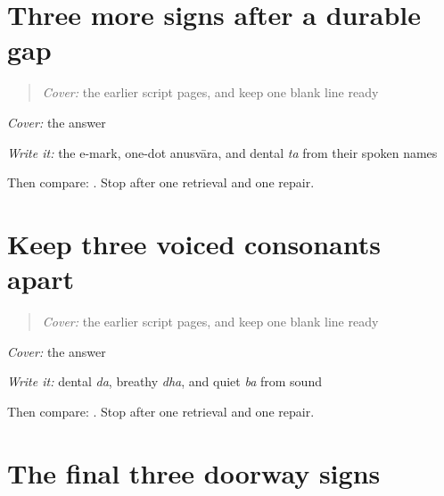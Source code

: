 \section[\texorpdfstring{\mr{े} / \mr{ं} / \mr{त} (e / anusvara / ta)}{े / ं / त (e / anusvara / ta)}]{Three more signs after a durable gap}

\label{lesson:MR-R09-script-b-r3}



\begin{quote}
\emph{Cover:} the earlier script pages, and keep one blank line ready
\end{quote}

\begin{tcolorbox}[breakable,colback=teal!4,colframe=teal!35!black,title={Before you move on}]
\emph{Cover:} the answer

\emph{Write it:} the e-mark, one-dot anusvāra, and dental \emph{ta} from their spoken names

Then compare: \textbf{  }. Stop after one retrieval and one repair.
\end{tcolorbox}
\section[\texorpdfstring{\mr{द} / \mr{ध} / \mr{ब} (da / dha / ba)}{द / ध / ब (da / dha / ba)}]{Keep three voiced consonants apart}

\label{lesson:MR-R09-script-c-r3}



\begin{quote}
\emph{Cover:} the earlier script pages, and keep one blank line ready
\end{quote}

\begin{tcolorbox}[breakable,colback=teal!4,colframe=teal!35!black,title={Before you move on}]
\emph{Cover:} the answer

\emph{Write it:} dental \emph{da}, breathy \emph{dha}, and quiet \emph{ba} from sound

Then compare: \textbf{  }. Stop after one retrieval and one repair.
\end{tcolorbox}
\section[\texorpdfstring{\mr{य} / \mr{ळ} / \mr{व} (ya / lla / va)}{य / ळ / व (ya / lla / va)}]{The final three doorway signs}

